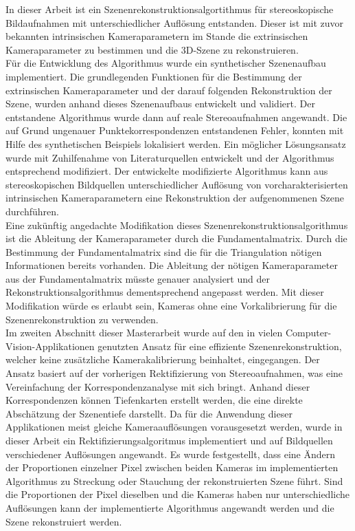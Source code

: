 
In dieser Arbeit ist ein Szenenrekonstruktionsalgortithmus für stereoskopische Bildaufnahmen mit unterschiedlicher Auflösung entstanden. Dieser ist mit zuvor bekannten intrinsischen Kameraparametern im Stande die extrinsischen Kameraparameter zu bestimmen und die 3D-Szene zu rekonstruieren. \\

Für die Entwicklung des Algorithmus wurde ein synthetischer Szenenaufbau implementiert. Die grundlegenden Funktionen für die Bestimmung der extrinsischen Kameraparameter und der darauf folgenden Rekonstruktion der Szene, wurden anhand dieses Szenenaufbaus entwickelt und validiert. Der entstandene Algorithmus wurde dann auf reale Stereoaufnahmen angewandt. Die auf Grund ungenauer Punktekorrespondenzen entstandenen Fehler, konnten mit Hilfe des synthetischen Beispiels lokalisiert werden. Ein möglicher Lösungsansatz wurde mit Zuhilfenahme von Literaturquellen entwickelt und der Algorithmus entsprechend modifiziert. Der entwickelte modifizierte Algorithmus kann aus stereoskopischen Bildquellen unterschiedlicher Auflösung von vorcharakterisierten intrinsischen Kameraparametern eine Rekonstruktion der aufgenommenen Szene durchführen.  \\

Eine zukünftig angedachte Modifikation dieses Szenenrekonstruktionsalgorithmus ist die Ableitung der Kameraparameter durch die Fundamentalmatrix. Durch die Bestimmung der Fundamentalmatrix sind die für die Triangulation nötigen Informationen bereits vorhanden. Die Ableitung der nötigen Kameraparameter aus der Fundamentalmatrix müsste genauer analysiert und der Rekonstruktionsalgorithmus dementsprechend angepasst werden. Mit dieser Modifikation würde es erlaubt sein, Kameras ohne eine Vorkalibrierung für die Szenenrekonstruktion zu verwenden. \\

Im zweiten Abschnitt dieser Masterarbeit wurde auf den in vielen Computer-Vision-Applikationen genutzten Ansatz für eine effiziente Szenenrekonstruktion, welcher keine zusätzliche Kamerakalibrierung beinhaltet, eingegangen. Der Ansatz basiert auf der vorherigen Rektifizierung von Stereoaufnahmen, was eine Vereinfachung der Korrespondenzanalyse mit sich bringt. Anhand dieser Korrespondenzen können Tiefenkarten erstellt werden, die eine direkte Abschätzung der Szenentiefe darstellt. Da für die Anwendung dieser Applikationen meist gleiche Kameraauflösungen vorausgesetzt werden, wurde in dieser Arbeit ein Rektifizierungsalgoritmus implementiert und auf Bildquellen verschiedener Auflösungen angewandt. Es wurde festgestellt, dass eine Ändern der Proportionen einzelner Pixel zwischen beiden Kameras im implementierten Algorithmus zu Streckung oder Stauchung der rekonstruierten Szene führt. Sind die Proportionen der Pixel dieselben und die Kameras haben nur unterschiedliche Auflösungen kann der implementierte Algorithmus angewandt werden und die Szene rekonstruiert werden. \\

